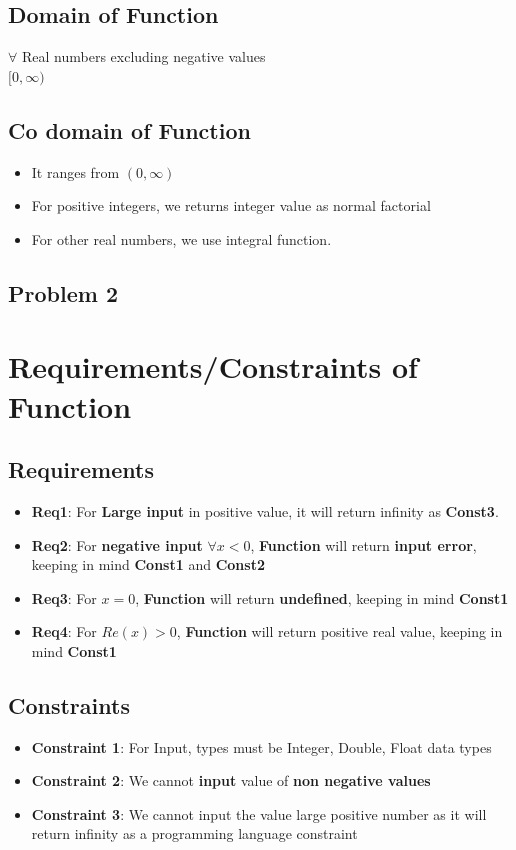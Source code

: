 \documentclass{article}
\begin{document}
\subsection{Domain of Function}
$\forall$ Real numbers excluding negative values \\
$[0, \infty)$

\subsection{Co domain of Function}
\begin{itemize}
\item It ranges from $(0, \infty)$
\item For positive integers, we returns integer value as normal factorial
\item For other real numbers, we use integral function.
\end{itemize}
\begin{center}
    \section*{Problem 2}
\end{center}
\section{Requirements/Constraints of Function}
\subsection{Requirements}
\begin{itemize}
\item \textbf{Req1}: For \textbf{Large input} in positive value, it will return infinity as \textbf{Const3}.
\item \textbf{Req2}: For \textbf{negative input} $\forall x<0 $, \textbf{Function} will return \textbf{input error}, keeping in mind \textbf{Const1} and \textbf{Const2}
\item \textbf{Req3}: For \textbf{$x=0$}, \textbf{Function} will return \textbf{undefined}, keeping in mind \textbf{Const1}
\item \textbf{Req4}: For \textbf{$Re(x) > 0$}, \textbf{Function} will return positive real value, keeping in mind \textbf{Const1}
\end{itemize}

\subsection{Constraints}
\begin{itemize}
\item \textbf{Constraint 1}: For Input, types must be Integer, Double, Float data types
\item \textbf{Constraint 2}: We cannot \textbf{input} value of \textbf{non negative values}
\item \textbf{Constraint 3}: We cannot input the value large positive number as it will return infinity as a programming language constraint
\end{itemize}
\end{document}
